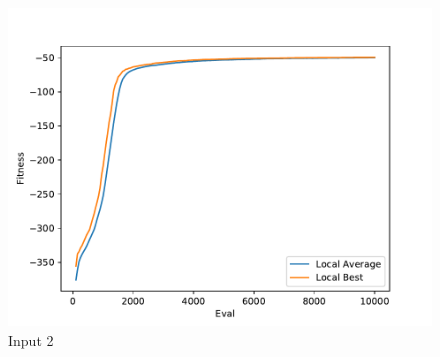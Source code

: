\documentclass{standalone}
\begin{document}
\begin{figure}[!htb]
	\caption{Input 2}
	\label{fig:graph_2038}
	\includegraphics[width=\textwidth]{../graphs/graphs/2038.pdf}
\end{figure}
\end{document}
